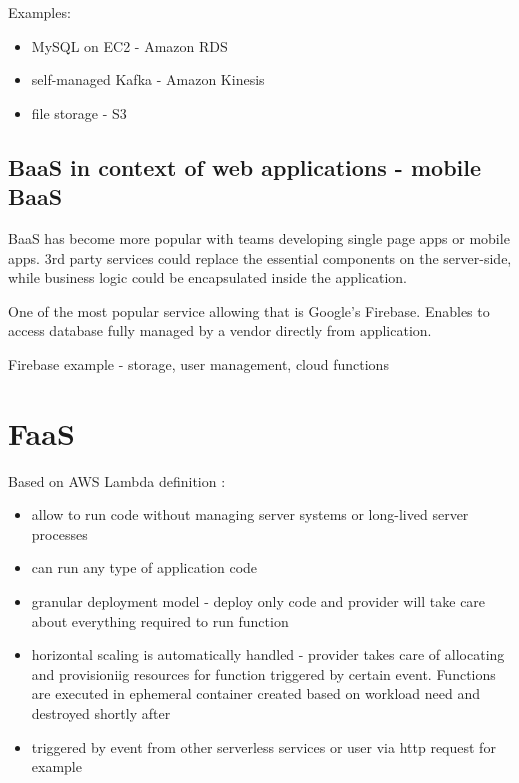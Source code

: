 Examples:

\begin{itemize}
    \item MySQL on EC2 - Amazon RDS
    \item self-managed Kafka - Amazon Kinesis
    \item file storage - S3
\end{itemize}

\subsection*{BaaS in context of web applications - mobile BaaS}

BaaS has become more popular with teams developing single page apps or mobile apps. 3rd party services could replace the essential components on the server-side, while business logic could be encapsulated inside the application.

One of the most popular service allowing that is Google's Firebase. Enables to access database fully managed by a vendor directly from application. 

Firebase example - storage, user management, cloud functions

\section*{FaaS}

Based on AWS Lambda definition \cite{MartinFowler}:

\begin{itemize}
    \item allow to run code without managing server systems or long-lived server processes
    \item can run any type of application code
    \item granular deployment model - deploy only code and provider will take care about everything required to run function
    \item horizontal scaling is automatically handled - provider takes care of allocating and provisioniig resources for function triggered by certain event. Functions are executed in ephemeral container created based on workload need and destroyed shortly after
    \item triggered by event from other serverless services or user via http request for example
\end{itemize}

\cite{RobertsChapin2017}

